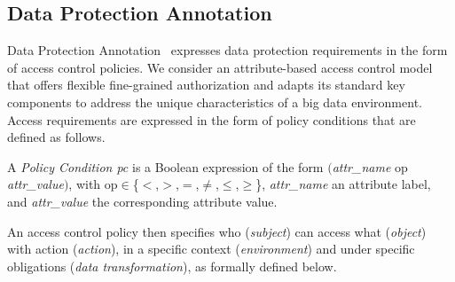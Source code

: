 


      \subsection{Data Protection Annotation}\label{sec:nonfuncannotation}
      Data Protection Annotation \myLambda\ expresses data protection requirements in the form of access control policies. We consider an attribute-based access control model that offers flexible fine-grained authorization and adapts its standard key components to address the unique characteristics of a big data environment. Access requirements are expressed in the form of policy conditions that are defined as follows.

      \begin{definition}\label{def:policy_cond}
        A \emph{Policy Condition pc} is a Boolean expression of the form $($\emph{attr\_name} op \emph{attr\_value}$)$, with op$\in$\{$<$,$>$,$=$,$\neq$,$\leq$,$\geq$\}, \emph{attr\_name} an attribute label, and \emph{attr\_value} the corresponding attribute value.
      \end{definition}

      An access control policy then specifies who (\emph{subject}) can access what (\emph{object}) with action (\emph{action}), in a specific context (\emph{environment}) and under specific obligations (\emph{data transformation}), as formally defined below.

